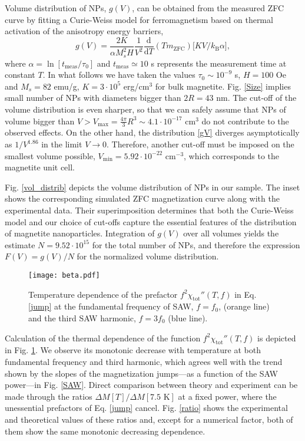 \documentclass[aps,prb,floats,twocolumn]{revtex4}
\begin{document}
Volume distribution of NPs, $g(V)$, can be obtained from the measured ZFC curve by fitting a Curie-Weiss model for ferromagnetism based on thermal activation of the anisotropy energy barriers,\cite{CT-1998}
\begin{equation}
\label{gV}
g(V)=\frac{2K}{\alpha M_{s}^{2}H}\frac{1}{V^{2}}\frac{\textrm{d}}{\textrm{d}T}\left(Tm_{\textrm{ZFC}}\right)\big[KV/k_{\textrm{B}}\alpha\big],
\end{equation} 
where $\alpha=\ln[t_{\textrm{meas}}/\tau_{0}]$ and $t_{\textrm{meas}}\simeq10$ s represents the measurement time at constant $T$. In what follows we have taken the values $\tau_{0}\sim10^{-9}$ s, $H=100$ Oe and $M_{s}=82$ emu/g, $K=3\cdot10^{5}$ erg/cm$^{3}$ for bulk magnetite. Fig. \ref{Size} implies small number of NPs with diameters bigger than $2R=43$ nm. The cut-off of the volume distribution is even sharper, so that we can safely assume that NPs of volume bigger than $V >V_{\textrm{max}}=\frac{4\pi}{3}R^{3} \sim4.1\cdot10^{-17}$ cm$^3$ do not contribute to the observed effects. On the other hand, the distribution \eqref{gV} diverges asymptotically as $1/V^{1.86}$ in the limit $V\rightarrow0$. Therefore, another cut-off must be imposed on the smallest volume possible, $V_{\textrm{min}}=5.92\cdot10^{-22}$ cm$^{-3}$, which corresponds to the magnetite unit cell.\cite{Comm4}

Fig. \ref{vol_distrib} depicts the volume distribution of NPs in our sample. The inset shows the corresponding simulated ZFC magnetization curve along with the experimental data. Their superimposition determines that both the Curie-Weiss model and our choice of cut-offs capture the essential features of the distribution of magnetite nanoparticles. Integration of $g(V)$ over all volumes yields the estimate $N=9.52\cdot10^{15}$ for the total number of NPs, and therefore the expression $F(V)=g(V)/N$ for the normalized volume distribution.

\begin{figure}[ht]
\begin{center}
\texttt{[image: beta.pdf]}
\caption{Temperature dependence of the prefactor $f^{2}\chi_{\textrm{tot}}''(T,f)$ in Eq. \eqref{jump} at the fundamental frequency of SAW, $f = f_{0}$, (orange line) and the third SAW harmonic, $f = 3f_{0}$ (blue line).}
\label{prefactor}
\end{center}
\end{figure}

Calculation of the thermal dependence of the function $f^{2}\chi_{\textrm{tot}}''(T,f)$ is depicted in Fig. \ref{prefactor}. We observe its monotonic decrease with temperature at both fundamental frequency and third harmonic, which agrees well with the trend shown by the slopes of the magnetization jumps---as a function of the SAW power---in Fig. \ref{SAW}. Direct comparison between theory and experiment can be made through the ratios $\Delta M[T]\big/\Delta M[7.5\textrm{ K}]$ at a fixed power, where the unessential prefactors of Eq. \eqref{jump} cancel. Fig. \ref{ratio} shows the experimental and theoretical values of these ratios and, except for a numerical factor, both of them show the same monotonic decreasing dependence.
\end{document}
